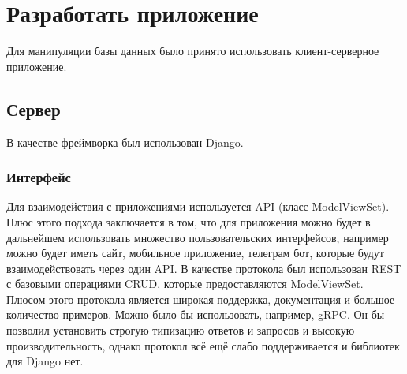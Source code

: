 \documentclass[a4paper,14pt]{extarticle}
\begin{document}
\section{Разработать приложение}
Для манипуляции базы данных было принято использовать клиент-серверное приложение.

\subsection{Сервер}
В качестве фреймворка был использован Django. 
\subsubsection{Интерфейс}
Для взаимодействия с
приложениями используется API (класс ModelViewSet). Плюс этого подхода заключается
в том, что для приложения можно будет в дальнейшем использовать множество 
пользовательских интерфейсов, например можно будет иметь сайт, мобильное приложение, 
телеграм бот, которые будут взаимодействовать через один API. 
В качестве протокола был использован REST с базовыми операциями CRUD, которые предоставляются
ModelViewSet. Плюсом этого протокола является широкая поддержка, документация и большое количество
примеров. Можно было бы использовать, например, gRPC. Он бы позволил установить 
строгую типизацию ответов и запросов и высокую производительность, однако протокол всё ещё слабо
поддерживается и библиотек для Django нет. 
\end{document}
